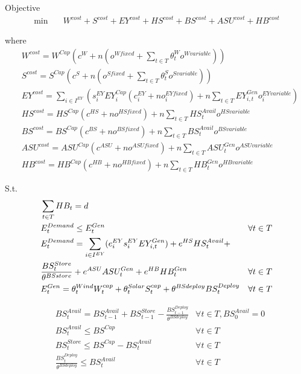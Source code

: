 \documentclass[12 pt]{article}
\begin{document}
Objective
\begin{align}
\min \quad
& W^{cost} + S^{cost} + EY^{cost} + HS^{cost} + BS^{cost} + ASU^{cost} + HB^{cost}
\end{align}




where
\begin{align}
& W^{cost} = W^{Cap}(c^{W} + n (o^{W fixed} + \sum_{t \in T}\theta^{W}_{t}o^{W variable}))\\
& S^{cost} = S^{Cap}(c^{S} + n (o^{S fixed}  + \sum_{t \in T}\theta^{S}_{t}o^{S variable}))\\
& EY^{cost} = \sum_{i \in I^{EY}}(s^{EY}_{i}EY^{Cap}_{i}(c^{EY}_{i} + no^{EY fixed}_{i})  + n\sum_{t \in T}EY^{Gen}_{i,t}o^{EY variable}_{i})\\
& HS^{cost} = HS^{Cap}(c^{HS} + no^{HS fixed})  + n\sum_{t \in T}HS^{Avail}_{t}o^{HS variable}\\
& BS^{cost} = BS^{Cap}(c^{BS} + no^{BS fixed})  + n\sum_{t \in T}BS^{Avail}_{t}o^{BS variable}\\
& ASU^{cost} = ASU^{Cap}(c^{ASU} + no^{ASU fixed}) + n\sum_{t \in T}ASU^{Gen}_{t}o^{ASU variable}\\
& HB^{cost} = HB^{Cap}(c^{HB} + no^{HB fixed}) + n\sum_{t \in T}HB^{Gen}_{t}o^{HB variable}
\end{align}

S.t.
\begin{align}
& \sum_{t\in T}HB_{t} = d \\
& E^{Demand}_{t} \leq E^{Gen}_t & \forall t \in T \\
& E^{Demand}_{t} = \sum_{i \in I^{EY}}(e^{EY}_{i}s^{EY}_{i}EY^{Gen}_{i,t}) + e^{HS}HS^{Avail}_{t} + \notag\\
& \frac{BS^{Store}_{t}}{\theta^{BSstore}} + e^{ASU}ASU^{Gen}_{t} + e^{HB}HB^{Gen}_{t} &\forall t \in T \\
& E^{Gen}_{t} = \theta^{Wind}_{t}W^{cap}_{t} + \theta^{Solar}_{t}S^{cap}_{t} + \theta^{BSdeploy}BS^{Deploy}_{t} & \forall t \in T
\end{align}


\begin{align}
& BS^{Avail}_{t} = BS^{Avail}_{t-1} + BS^{Store}_{t-1} - \frac{BS^{Deploy}_{t-1}}{\theta^{BSdeploy}} & \forall t \in T,BS^{Avail}_{0} = 0 \\
& BS^{Avail}_{t} \leq BS^{Cap} & \forall t \in T \\
& BS^{Store}_{t} \leq BS^{Cap}-BS^{Avail}_{t} & \forall t \in T \\
&  \frac{BS^{Deploy}_{t}}{\theta^{BSdeploy}} \leq BS^{Avail}_{t} & \forall t \in T
\end{align}
\end{document}
